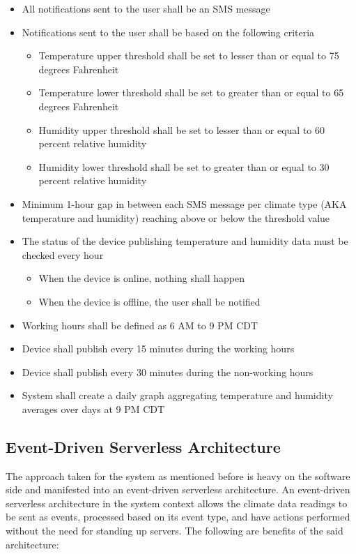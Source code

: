\documentclass{article}
\begin{document}
\begin{itemize}
    \item All notifications sent to the user shall be an SMS message
    \item Notifications sent to the user shall be based on the following criteria
          \begin{itemize}
              \item Temperature upper threshold shall be set to lesser than or equal to 75 degrees Fahrenheit
              \item Temperature lower threshold shall be set to greater than or equal to 65 degrees Fahrenheit
              \item Humidity upper threshold shall be set to lesser than or equal to 60 percent relative humidity
              \item Humidity lower threshold shall be set to greater than or equal to 30 percent relative humidity
          \end{itemize}
    \item Minimum 1-hour gap in between each SMS message per climate type (AKA temperature and humidity) reaching above or below the threshold value
    \item The status of the device publishing temperature and humidity data must be checked every hour
          \begin{itemize}
              \item When the device is online, nothing shall happen
              \item When the device is offline, the user shall be notified
          \end{itemize}
    \item Working hours shall be defined as 6 AM to 9 PM CDT
    \item Device shall publish every 15 minutes during the working hours
    \item Device shall publish every 30 minutes during the non-working hours
    \item System shall create a daily graph aggregating temperature and humidity averages over days at 9 PM CDT
\end{itemize}

\subsection{Event-Driven Serverless Architecture}
\label{section:architecture}
The approach taken for the system as mentioned before is heavy on the software side and manifested into an event-driven serverless architecture. An event-driven serverless architecture in the system context allows the climate data readings to be sent as events, processed based on its event type, and have actions performed without the need for standing up servers. The following are benefits of the said architecture:
\end{document}
